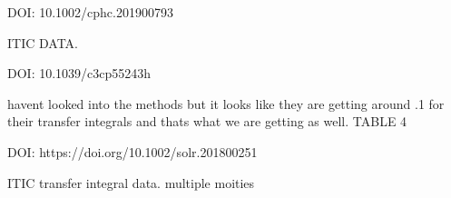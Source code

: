 DOI: 10.1002/cphc.201900793

        ITIC DATA.

DOI: 10.1039/c3cp55243h

    havent looked into the methods but it looks like they are getting around .1 for their transfer
    integrals and thats what we are getting as well.  TABLE 4


DOI: https://doi.org/10.1002/solr.201800251

    ITIC transfer integral data. multiple moities
